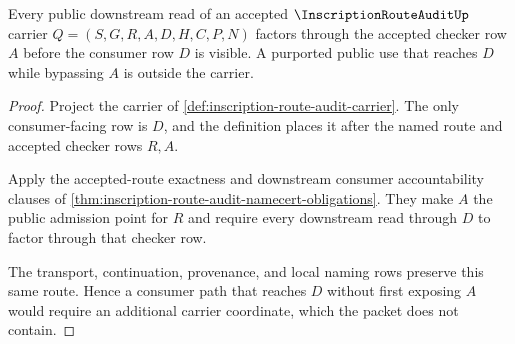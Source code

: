\begin{theorem}
\label{thm:inscription-route-audit-falsifiable-prediction}
Every public downstream read of an accepted $\InscriptionRouteAuditUp$ carrier
$Q=(S,G,R,A,D,H,C,P,N)$ factors through the accepted checker row $A$ before the
consumer row $D$ is visible. A purported public use that reaches $D$ while
bypassing $A$ is outside the carrier.
\end{theorem}
\begin{proof}
Project the carrier of \autoref{def:inscription-route-audit-carrier}. The only
consumer-facing row is $D$, and the definition places it after the named route
and accepted checker rows $R,A$.

Apply the accepted-route exactness and downstream consumer accountability
clauses of \autoref{thm:inscription-route-audit-namecert-obligations}. They
make $A$ the public admission point for $R$ and require every downstream read
through $D$ to factor through that checker row.

The transport, continuation, provenance, and local naming rows preserve this
same route. Hence a consumer path that reaches $D$ without first exposing $A$
would require an additional carrier coordinate, which the packet does not
contain.
\end{proof}


